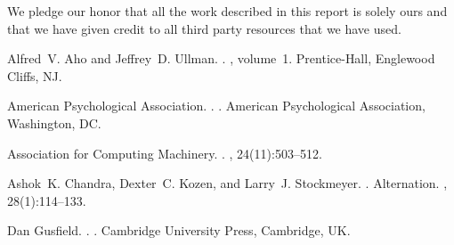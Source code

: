 \documentclass[11pt]{article}
\begin{document}
We pledge our honor that all the work described in this report is solely ours and
that we have given credit to all third party resources that we have used.

%
%

\begin{thebibliography}{}

Alfred~V. Aho and Jeffrey~D. Ullman.
.
, volume~1.
\newblock Prentice-{Hall}, Englewood Cliffs, NJ.

{American Psychological Association}.
.
.
\newblock American Psychological Association, Washington, DC.

{Association for Computing Machinery}.
.
, 24(11):503--512.

Ashok~K. Chandra, Dexter~C. Kozen, and Larry~J. Stockmeyer.
.
\newblock Alternation.
,
  28(1):114--133.

Dan Gusfield.
.
.
\newblock Cambridge University Press, Cambridge, UK.

\end{thebibliography}
\end{document}

